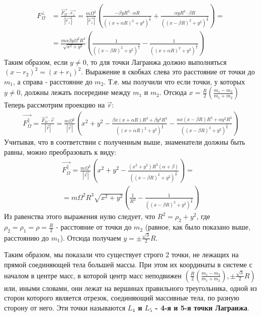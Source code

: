 \documentclass[a4paper]{article} %
\begin{document}
\begin{equation}
\begin{split}
F_{\Omega}^{\perp} &= \frac{\vec{F_\Omega}\cdot\vec{r_\perp}}{|\vec{r_\perp}|} = \frac{m\Omega^2}{|\vec{r_\perp}|} \left(\frac{-\beta yR^3\cdot\alpha R}{((x + \alpha R)^2 + y^2)^\frac{3}{2}} + \frac{\alpha yR^3\cdot\beta R}{((x - \beta R)^2 + y^2)^\frac{3}{2}}\right) = \\
&= \frac{m\alpha\beta y\Omega^2 R^4}{\sqrt{x^2 + y^2}} \left(\frac{1}{((x - \beta R)^2 + y^2)^\frac{3}{2}} - \frac{1}{((x + \alpha R)^2 + y^2)^\frac{3}{2}}\right)
\end{split}
\end{equation}
Таким образом, если $y\neq 0$, то для точки Лагранжа должно выполняться $(x - r_2)^2 = (x + r_1)^2$. Выражение в скобках слева это расстояние от точки до $m_1$, а справа - расстояние до $m_2$. Т.е. мы получили что если точки, у которых $y\neq 0$, должны лежать посередине между $m_1$ и $m_2$. Отсюда $x = \frac{R}{2}\left(\frac{m_1 - m_2}{m_1 + m_2}\right)$ Теперь рассмотрим проекцию на $\vec{r}$:
\begin{equation}
\begin{split}
\vec{F_\Omega^\parallel} = \frac{\vec{F_\Omega}\cdot\vec{r}}{|\vec{r}|} = \frac{m\Omega^2}{|\vec{r}|} \left(x^2 + y^2 - \frac{\beta x(x+\alpha R)R^3 + \beta y^2 R^3}{((x + \alpha R)^2 + y^2)^\frac{3}{2}} - \frac{\alpha x(x-\beta R)R^3 + \alpha y^2 R^3}{((x - \beta R)^2 + y^2)^\frac{3}{2}}\right)
\end{split}
\end{equation}
Учитывая, что в соответствии с полученным выше, знаменатели должны быть равны, можно преобразовать к виду:
\begin{equation}
\begin{split}
\vec{F_\Omega^\parallel} = \frac{m\Omega^2}{|\vec{r}|} \left(x^2 + y^2 - \frac{(x^2 + y^2)R^3(\alpha + \beta)}{((x - \beta R)^2 + y^2)^\frac{3}{2}}\right) = \\
= m\Omega^2 R^3\sqrt{x^2 + y^2}\left(\frac{1}{R^3} - \frac{1}{((x - \beta R)^2 + y^2)^\frac{3}{2}}\right)
\end{split}
\end{equation}
Из равенства этого выражения нулю следует, что $R^2 = \rho_2 + y^2$, где $\rho_2 = \rho_1 = \rho = \frac{R}{2}$ - расстояние от точки до $m_2$ (равное, как было показано выше, расстоянию до $m_1$). Отсюда получаем $y = \pm\frac{\sqrt{3}}{2}R$.

Таким образом, мы показали что существует строго 2 точки, не лежащих на прямой соединяющей тела большей массы. При этом их координаты в системе с началом в центре масс, в которой центр масс неподвижен $\left(\frac{R}{2}\left(\frac{m_1 - m_2}{m_1 + m_2}\right), \pm\frac{\sqrt{3}}{2}R\right)$ или, иными словами, они лежат на вершинах правильного треугольника, одной из сторон которого является отрезок, соединяющий массивные тела, по разную сторону от него. Эти точки называются \textbf{$L_4$ и $L_5$ - 4-я и 5-я точки Лагранжа}.
\end{document}
